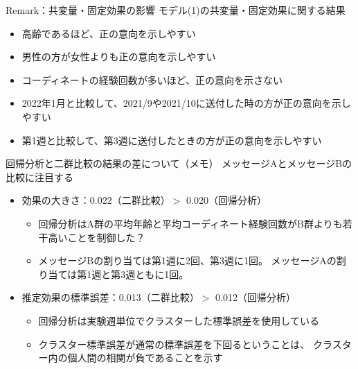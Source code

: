 \documentclass[
      aspectratio=169,
        12pt,
    ]{beamer}
\providecommand{\tightlist}{%
  \setlength{\itemsep}{0pt}\setlength{\parskip}{0pt}}
\begin{document}
\begin{frame}{Remark：共変量・固定効果の影響}
\protect\hypertarget{remarkux5171ux5909ux91cfux56faux5b9aux52b9ux679cux306eux5f71ux97ff-1}{}
モデル(1)の共変量・固定効果に関する結果

\begin{itemize}
\tightlist
\item
  高齢であるほど、正の意向を示しやすい
\item
  男性の方が女性よりも正の意向を示しやすい
\item
  コーディネートの経験回数が多いほど、正の意向を示さない
\item
  2022年1月と比較して、2021/9や2021/10に送付した時の方が正の意向を示しやすい
\item
  第1週と比較して、第3週に送付したときの方が正の意向を示しやすい
\end{itemize}
\end{frame}

\begin{frame}{回帰分析と二群比較の結果の差について（メモ）}
\protect\hypertarget{ux56deux5e30ux5206ux6790ux3068ux4e8cux7fa4ux6bd4ux8f03ux306eux7d50ux679cux306eux5deeux306bux3064ux3044ux3066ux30e1ux30e2-1}{}
メッセージAとメッセージBの比較に注目する

\begin{itemize}
\tightlist
\item
  効果の大きさ：0.022（二群比較）\(>\) 0.020（回帰分析）

  \begin{itemize}
  \tightlist
  \item
    回帰分析はA群の平均年齢と平均コーディネート経験回数がB群よりも若干高いことを制御した？
  \item
    メッセージBの割り当ては第1週に2回、第3週に1回。
    メッセージAの割り当ては第1週と第3週ともに1回。
  \end{itemize}
\item
  推定効果の標準誤差：0.013（二群比較）\(>\) 0.012（回帰分析）

  \begin{itemize}
  \tightlist
  \item
    回帰分析は実験週単位でクラスターした標準誤差を使用している
  \item
    クラスター標準誤差が通常の標準誤差を下回るということは、
    クラスター内の個人間の相関が負であることを示す
  \end{itemize}
\end{itemize}
\end{frame}
\end{document}
